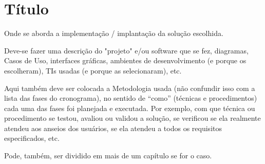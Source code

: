 \chapter{Título}
Onde se aborda a implementação / implantação da solução escolhida. 

Deve-se fazer uma descrição do "projeto" e/ou software que se fez, diagramas, Casos de Uso, interfaces gráficas, ambientes de desenvolvimento (e porque os escolheram), TIs usadas (e porque as selecionaram), etc.

Aqui também deve ser colocada a Metodologia usada (não confundir isso com a lista das fases do cronograma), no sentido de “como” (técnicas e procedimentos) cada uma das fases foi planejada e executada. Por exemplo, com que técnica ou procedimento se testou, avaliou ou validou a solução, se verificou se ela realmente atendeu aos anseios dos usuários, se ela atendeu a todos os requisitos especificados, etc.

Pode, também, ser dividido em mais de um capítulo se for o caso.
